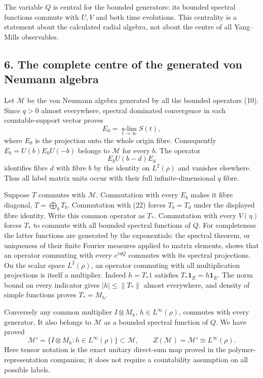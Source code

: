 \documentclass[
  11pt,
]{article}
\begin{document}
The variable \(Q\) is central for the bounded generators: its bounded
spectral functions commute with \(U,V\) and both time evolutions. This
centrality is a statement about the calculated radial algebra, not about
the centre of all Yang--Mills observables.

\subsection{6. The complete centre of the generated von Neumann
algebra}\label{weak-coupling-part-7-the-complete-centre-of-the-generated-von-neumann-algebra}

Let \(\mathcal M\) be the von Neumann algebra generated by all the
bounded operators (10). Since \(q>0\) almost everywhere, spectral
dominated convergence in each countable-support vector proves \[
 E_0=\operatorname*{s-lim}_{t\to\infty}S(t),
 \tag{21}
\] where \(E_0\) is the projection onto the whole origin fibre.
Consequently \(E_b=U(b)E_0U(-b)\) belongs to \(\mathcal M\) for every
\(b\). The operator \[
 E_bU(b-d)E_d
 \tag{22}
\] identifies fibre \(d\) with fibre \(b\) by the identity on
\(L^2(\rho)\) and vanishes elsewhere. Thus all label matrix units occur
with their full infinite-dimensional \(q\) fibre.

Suppose \(T\) commutes with \(\mathcal M\). Commutation with every
\(E_b\) makes it fibre diagonal, \(T=\bigoplus_b T_b\). Commutation with
(22) forces \(T_b=T_d\) under the displayed fibre identity. Write this
common operator as \(T_*\). Commutation with every \(V(\eta)\) forces
\(T_*\) to commute with all bounded spectral functions of \(Q\). For
completeness the latter functions are generated by the exponentials: the
spectral theorem, or uniqueness of their finite Fourier measures applied
to matrix elements, shows that an operator commuting with every
\(e^{i\eta Q}\) commutes with its spectral projections. On the scalar
space \(L^2(\rho)\), an operator commuting with all multiplication
projections is itself a multiplier. Indeed \(h=T_*1\) satisfies
\(T_*\mathbf1_E=h\mathbf1_E\). The norm bound on every indicator gives
\(|h|\le\|T_*\|\) almost everywhere, and density of simple functions
proves \(T_*=M_h\).

Conversely any common multiplier \(I\otimes M_h\),
\(h\in L^\infty(\rho)\), commutes with every generator. It also belongs
to \(\mathcal M\) as a bounded spectral function of \(Q\). We have
proved \[
 \mathcal M'=\{I\otimes M_h:h\in L^\infty(\rho)\}
 \subset\mathcal M,\qquad
 Z(\mathcal M)=\mathcal M'
 \cong L^\infty(\rho).
 \tag{23}
\] Here tensor notation is the exact unitary direct-sum map proved in
the polymer-representation companion; it does not require a countability
assumption on all possible labels.
\end{document}
